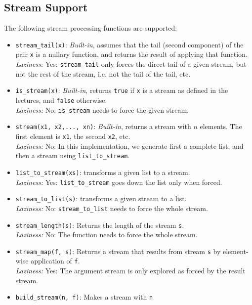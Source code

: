 \subsection*{Stream Support}

The following stream processing functions are supported:

\begin{itemize}
\item \lstinline{stream_tail(x)}: \textit{Built-in}, assumes that the tail (second component) of the
  pair \lstinline{x} is a nullary function, and returns the result of
  applying that function.\\
\emph{Laziness:}  Yes: \lstinline{stream_tail} only forces the direct tail of a given
stream,
but not the rest of the stream, i.e. not the tail of the tail, etc.
\item \lstinline{is_stream(x)}: \textit{Built-in}, returns \lstinline{true} if
  \lstinline{x} is a stream as defined in the lectures, and
  \lstinline{false} otherwise.\\
\emph{Laziness:}  No: \lstinline{is_stream} needs to force the given stream.
\item \lstinline{stream(x1, x2,..., xn)}: \textit{Built-in}, returns a stream with $n$ elements. The
first element is \lstinline{x1}, the second \lstinline{x2}, etc.\\
\emph{Laziness:}  No: In this implementation, we generate first a
           complete list, and then a stream using \lstinline{list_to_stream}.
\item \lstinline{list_to_stream(xs)}: transforms a given list to a stream.\\
\emph{Laziness:}  Yes: \lstinline{list_to_stream} goes down the list only when forced.
\item \lstinline{stream_to_list(s)}: transforms a given stream to a list.\\
\emph{Laziness:}  No: \lstinline{stream_to_list} needs to force the whole stream.
\item \lstinline{stream_length(s)}: Returns the length of the stream
  \lstinline{s}.\\
\emph{Laziness:}  No: The function needs to force the whole stream.
\item \lstinline{stream_map(f, s)}: Returns a stream that results from stream
  \lstinline{s} by element-wise application of \lstinline{f}.\\
\emph{Laziness:}  Yes: The argument stream is only explored as forced by
           the result stream.
\item \lstinline{build_stream(n, f)}: Makes a stream with \lstinline{n}

\end{itemize}
